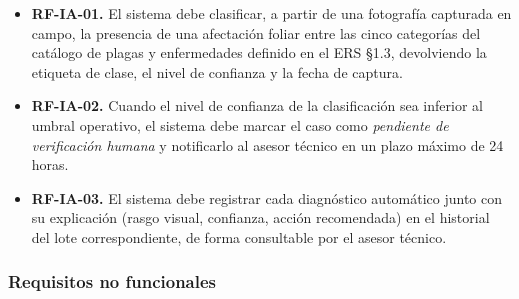 \documentclass[11pt,a4paper]{article}
\begin{document}
\begin{itemize}[nosep]
  \item \textbf{RF-IA-01.} El sistema debe clasificar, a partir de una fotografía capturada en
        campo, la presencia de una afectación foliar entre las cinco categorías del catálogo de
        plagas y enfermedades definido en el ERS §1.3, devolviendo la etiqueta de clase, el nivel
        de confianza y la fecha de captura.
  \item \textbf{RF-IA-02.} Cuando el nivel de confianza de la clasificación sea inferior al umbral
        operativo, el sistema debe marcar el caso como \emph{pendiente de verificación humana} y
        notificarlo al asesor técnico en un plazo máximo de 24 horas.
  \item \textbf{RF-IA-03.} El sistema debe registrar cada diagnóstico automático junto con su
        explicación (rasgo visual, confianza, acción recomendada) en el historial del lote
        correspondiente, de forma consultable por el asesor técnico.
\end{itemize}

\subsubsection{Requisitos no funcionales}
\end{document}
